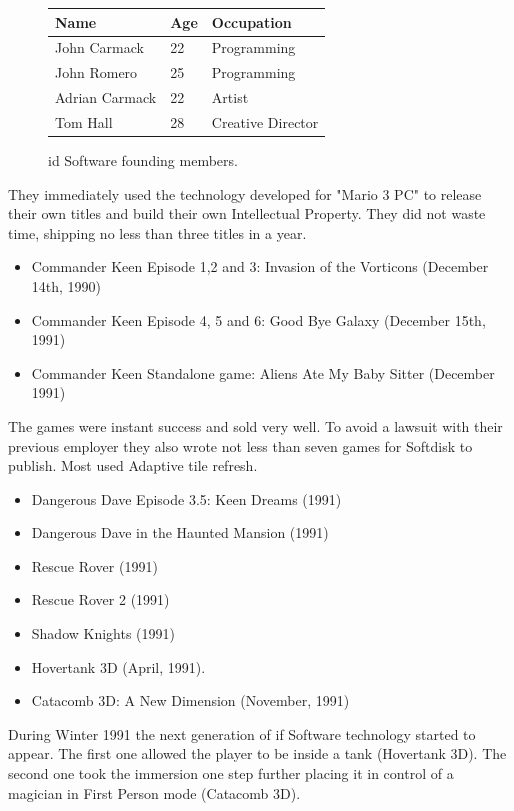 \documentclass[book.tex]{subfiles}
\begin{document}
 \begin{figure}[H]
\centering  
\begin{tabularx}{\textwidth}{ X  X  X  }
  \toprule
  \textbf{Name} &  \textbf{Age} & \textbf{Occupation} \\
  \toprule 
   John Carmack & 22 &  Programming\\
   John Romero & 25 &  Programming\\
   Adrian Carmack & 22 &  Artist\\
   Tom Hall & 28 &  Creative Director\\
     \toprule
\end{tabularx}
\caption{id Software founding members.}\label{fig:Id Software team}
\end{figure}
They immediately used the technology developed for "Mario 3 PC" to release their own titles and build their own Intellectual Property. They did not waste time, shipping no less than three titles in a year.
\begin{itemize}
    \item Commander Keen Episode 1,2 and 3: Invasion of the Vorticons (December 14th, 1990)
    \item Commander Keen Episode 4, 5 and 6: Good Bye Galaxy (December 15th, 1991)
    \item Commander Keen Standalone game: Aliens Ate My Baby Sitter (December 1991)
\end{itemize}
The games were instant success and sold very well. To avoid a lawsuit with their previous employer they also wrote not less than seven games for Softdisk to publish. Most used Adaptive tile refresh.
\begin{itemize}
  \item Dangerous Dave Episode 3.5: Keen Dreams (1991)
  \item Dangerous Dave in the Haunted Mansion (1991)
  \item Rescue Rover (1991)
  \item Rescue Rover 2 (1991)
  \item Shadow Knights (1991)
  \item Hovertank 3D (April, 1991).
  \item Catacomb 3D: A New Dimension (November, 1991)
\end{itemize}
During Winter 1991 the next generation of if Software technology started to appear. The first one allowed the player to be inside a tank (Hovertank 3D). The second one took the immersion one step further placing it in control of a magician in First Person mode (Catacomb 3D).\\
\par
\end{document}
